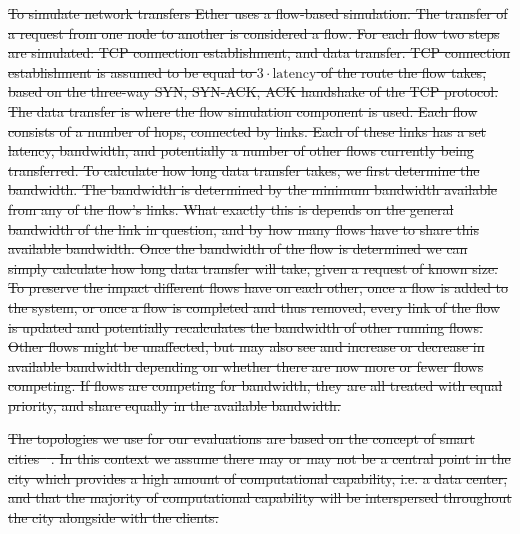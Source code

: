 \documentclass[draft,final]{vutinfth} %
\providecommand{\DIFdeltex}[1]{{\protect\color{red}\sout{#1}}}                      %
\providecommand{\DIFdel}[1]{\texorpdfstring{\DIFdeltex{#1}}{}} %
\begin{document}
\DIFdel{To simulate network transfers Ether uses a flow-based simulation.
The transfer of a request from one node to another is considered a flow.
For each flow two steps are simulated: TCP connection establishment, and data transfer.
TCP connection establishment is assumed to be equal to $ 3 \cdot \text{latency}$ of the route the flow takes, based on the three-way SYN, SYN-ACK, ACK handshake of the TCP protocol.}%
\DIFdel{The data transfer is where the flow simulation component is used.
Each flow consists of a number of hops, connected by links.
Each of these links has a set latency, bandwidth, and potentially a number of other flows currently being transferred.
To calculate how long data transfer takes, we first determine the bandwidth.
The bandwidth is determined by the minimum bandwidth available from any of the flow's links.
What exactly this is depends on the general bandwidth of the link in question, and by how many flows have to share this available bandwidth.
Once the bandwidth of the flow is determined we can simply calculate how long data transfer will take, given a request of known size.
To preserve the impact different flows have on each other, once a flow is added to the system, or once a flow is completed and thus removed, every link of the flow is updated and potentially recalculates the bandwidth of other running flows.
Other flows might be unaffected, but may also see and increase or decrease in available bandwidth depending on whether there are now more or fewer flows competing.
If flows are competing for bandwidth, they are all treated with equal priority, and share equally in the available bandwidth.
}%

\DIFdel{The topologies we use for our evaluations are based on the concept of smart cities\mbox{%
\cite{suSmartCityApplications2011}}\hskip0pt%
.
In this context we assume there may or may not be a central point in the city which provides a high amount of computational capability, i.e. a data center, and that the majority of computational capability will be interspersed throughout the city alongside with the clients.
}%
\end{document}
